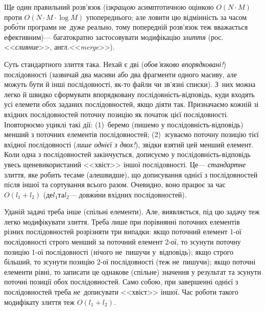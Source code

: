 \documentclass[14pt,a4paper]{extarticle}
\begin{document}
Ще один правильний розв'язок (із\nolinebreak[2] \emph{кращою} асимптотичною оцінкою $O(N{\cdot}M)$ проти $O(N{\cdot}M{\cdot}\log{}M)$ у\nolinebreak[3] попереднього; але ловити цю відмінність за часом роб\'{о}ти програми не~дуже реально, тому попередній розв'язок теж вважається ефективним)\nolinebreak[3] --- багатократно застосовувати модифікацію \emph{злиття} (рос.\nolinebreak[3] <<\emph{слияние}>>, англ.\nolinebreak[3] <<\emph{merge}>>). 

Суть стандартного злиття така. Нехай є дві (\emph{обов'язково впорядковані!}) послідовності (зазвичай два масиви або два фрагменти одного масиву, але можуть бути й інші послідовності, як-то файли чи зв'язні списки). З~них можна легко й швидко сформувати впорядковану послі\-дов\-ність-від\-повідь, куди входять усі елемети обох заданих послідовностей, якщо діяти так. Призначаємо кожній зі вхідних послідовностей поточну позицію як початок цієї послідовності. І\nolinebreak[3] повторюємо у\nolinebreak[3] циклі такі дії: (1)~беремо (пишемо у послі\-дов\-ність-від\-по\-відь) менший з поточних елементів послідовностей; (2)~зсуваємо поточну позицію тієї вхідної послідовності (\emph{лише однієї з двох!}), звідки взятий цей менший елемент. Коли одна з послідовностей закінчується, дописуємо у послі\-дов\-ність-від\-по\-відь увесь ще\nolinebreak[3] не\nolinebreak[3] використаний <<хвіст>> іншої послідовності. Це\nolinebreak[3] --- \emph{стандартне} злиття, яке робить те\nolinebreak[3] саме (але\nolinebreak[3] швидше), що дописування однієї з послідовностей після іншої та сортування всього разом. Очевидно, воно працює за час $O(l_1{+}l_2)$ (де\nolinebreak[3] $l_1$\nolinebreak[1] та\nolinebreak[3] $l_2$\nolinebreak[3] --- довж\'{и}ни вхідних послідовностей).

У\nolinebreak[3] даній задачі треба інше (спільні елементи). Але, виявляється, під цю задачу теж легко модифікувати злиття. Треба лише при порівнянні поточних елементів різних послідовностей розрізняти три випадки: якщо поточний елемент \mbox{1-ої} послідовності строго менший за поточний елемент \mbox{2-ої}, то зсунути поточну позицію \mbox{1-ої} послідовності (нічого не~пишучи у~відповідь); якщо строго більший, то зсунути позицію \mbox{2-ої} послідовності (теж не~пишучи); якщо поточні елементи рівні, то записати це однакове (спільне) значення у результат та зсунути поточні позиції обох послідовностей. Само собою, при завершенні однієї з послідовностей треба \emph{не}~дописувати <<хвіст>> іншої. Час роботи такого модифікату злиття теж $O(l_1{+}l_2)$.
\end{document}
